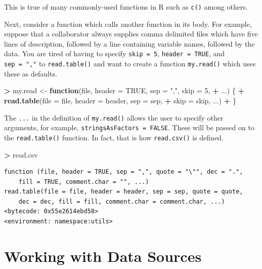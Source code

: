 \documentclass[]{krantz}
\makeatletter
\newenvironment{Shaded}{\begin{snugshade}}{\end{snugshade}}
\newcommand{\KeywordTok}[1]{\textcolor[rgb]{0.27,0.27,0.27}{\textbf{#1}}}
\newcommand{\DataTypeTok}[1]{\textcolor[rgb]{0.27,0.27,0.27}{#1}}
\newcommand{\DecValTok}[1]{\textcolor[rgb]{0.06,0.06,0.06}{#1}}
\newcommand{\StringTok}[1]{\textcolor[rgb]{0.5,0.5,0.5}{#1}}
\newcommand{\OtherTok}[1]{\textcolor[rgb]{0.37,0.37,0.37}{#1}}
\newcommand{\ControlFlowTok}[1]{\textcolor[rgb]{0.27,0.27,0.27}{\textbf{#1}}}
\newcommand{\OperatorTok}[1]{\textcolor[rgb]{0.43,0.43,0.43}{\textbf{#1}}}
\newcommand{\NormalTok}[1]{#1}
\newenvironment{kframe}{%
\medskip{}
\setlength{\fboxsep}{.8em}
 \def\at@end@of@kframe{}%
 \ifinner\ifhmode%
  \def\at@end@of@kframe{\end{minipage}}%
  \begin{minipage}{\columnwidth}%
 \fi\fi%
 \def\FrameCommand##1{\hskip\@totalleftmargin \hskip-\fboxsep
 \colorbox{shadecolor}{##1}\hskip-\fboxsep
     \hskip-\linewidth \hskip-\@totalleftmargin \hskip\columnwidth}%
 \MakeFramed {\advance\hsize-\width
   \@totalleftmargin\z@ \linewidth\hsize
   \@setminipage}}%
 {\par\unskip\endMakeFramed%
 \at@end@of@kframe}
\renewenvironment{Shaded}{\begin{kframe}}{\end{kframe}}
\theoremstyle{definition}
\theoremstyle{definition}
\theoremstyle{definition}
\theoremstyle{remark}
\makeatother
\begin{document}
This is true of many commonly-used functions in R such as \texttt{c()}
among others.

Next, consider a function which calls another function in its body. For
example, suppose that a collaborator always supplies comma delimited
files which have five lines of description, followed by a line
containing variable names, followed by the data. You are tired of having
to specify \texttt{skip\ =\ 5}, \texttt{header\ =\ TRUE}, and
\texttt{sep\ =\ ","} to \texttt{read.table()} and want to create a
function \texttt{my.read()} which uses these as defaults.

\begin{Shaded}
\begin{Highlighting}[]
\OperatorTok{>}\StringTok{ }\NormalTok{my.read <-}\StringTok{ }\ControlFlowTok{function}\NormalTok{(file, }\DataTypeTok{header =} \OtherTok{TRUE}\NormalTok{, }\DataTypeTok{sep =} \StringTok{","}\NormalTok{, }\DataTypeTok{skip =} \DecValTok{5}\NormalTok{, }
\OperatorTok{+}\StringTok{   }\NormalTok{...) \{}
\OperatorTok{+}\StringTok{   }\KeywordTok{read.table}\NormalTok{(}\DataTypeTok{file =}\NormalTok{ file, }\DataTypeTok{header =}\NormalTok{ header, }\DataTypeTok{sep =}\NormalTok{ sep, }
\OperatorTok{+}\StringTok{     }\DataTypeTok{skip =}\NormalTok{ skip, ...)}
\OperatorTok{+}\StringTok{ }\NormalTok{\}}
\end{Highlighting}
\end{Shaded}

The \texttt{...} in the definition of \texttt{my.read()} allows the user
to specify other arguments, for example,
\texttt{stringsAsFactors\ =\ FALSE}. These will be passed on to the
\texttt{read.table()} function. In fact, that is how \texttt{read.csv()}
is defined.

\begin{Shaded}
\begin{Highlighting}[]
\OperatorTok{>}\StringTok{ }\NormalTok{read.csv}
\end{Highlighting}
\end{Shaded}

\begin{verbatim}
function (file, header = TRUE, sep = ",", quote = "\"", dec = ".", 
    fill = TRUE, comment.char = "", ...) 
read.table(file = file, header = header, sep = sep, quote = quote, 
    dec = dec, fill = fill, comment.char = comment.char, ...)
<bytecode: 0x55e2614ebd58>
<environment: namespace:utils>
\end{verbatim}

\chapter{Working with Data Sources}\label{working-with-data-sources}
\end{document}
